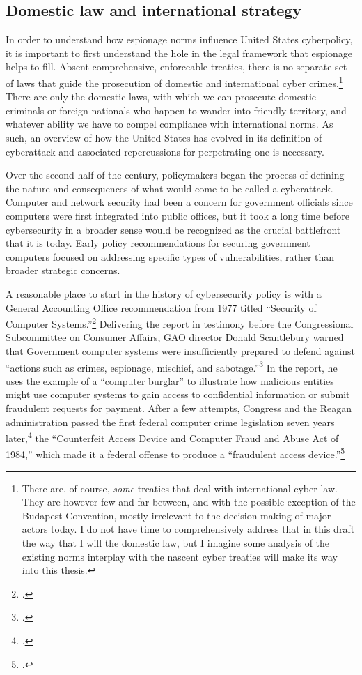 \documentclass{memoir}
\begin{document}
\begin{refsegment}
\subsection{Domestic law and international strategy}
In order to understand how espionage norms influence United States cyberpolicy, it is important to first understand the hole in the legal framework that espionage helps to fill. Absent comprehensive, enforceable treaties, there is no separate set of laws that guide the prosecution of domestic and international cyber crimes.\footnote{There are, of course, \emph{some} treaties that deal with international cyber law. They are however few and far between, and with the possible exception of the Budapest Convention, mostly irrelevant to the decision-making of major actors today. I do not have time to comprehensively address that in this draft the way that I will the domestic law, but I imagine some analysis of the existing norms interplay with the nascent cyber treaties will make its way into this thesis.} There are only the domestic laws, with which we can prosecute domestic criminals or foreign nationals who happen to wander into friendly territory, and whatever ability we have to compel compliance with international norms. As such, an overview of how the United States has evolved in its definition of cyberattack and associated repercussions for perpetrating one is necessary.

Over the second half of the  century, policymakers began the process of defining the nature and consequences of what would come to be called a cyberattack. Computer and network security had been a concern for government officials since computers were first integrated into public offices, but it took a long time before cybersecurity in a broader sense would be recognized as the crucial battlefront that it is today. Early policy recommendations for securing government computers focused on addressing specific types of vulnerabilities, rather than broader strategic concerns.

A reasonable place to start in the history of cybersecurity policy is with a General Accounting Office recommendation from 1977 titled ``Security of Computer Systems.''\footcite{washington_post_staff_timeline_2003} Delivering the report in testimony before the Congressional Subcommittee on Consumer Affairs, GAO director Donald Scantlebury warned that Government computer systems were insufficiently prepared to defend against ``actions such as crimes, espionage, mischief, and sabotage.''\footcite{u.s._government_accounting_office_security_1977} In the report, he uses the example of a ``computer burglar'' to illustrate how malicious entities might use computer systems to gain access to confidential information or submit fraudulent requests for payment. After a few attempts, Congress and the Reagan administration passed the first federal computer crime legislation seven years later,\footcite[This later bill, the Computer Security Act of 1987, describes the 1984 bill as being the first federal legislation in this area.]{glickman_computer_1988} the ``Counterfeit Access Device and Computer Fraud and Abuse Act of 1984,'' which made it a federal offense to produce a ``fraudulent access device.''\footcite{hughes_access_1984}


\end{refsegment}
\end{document}
